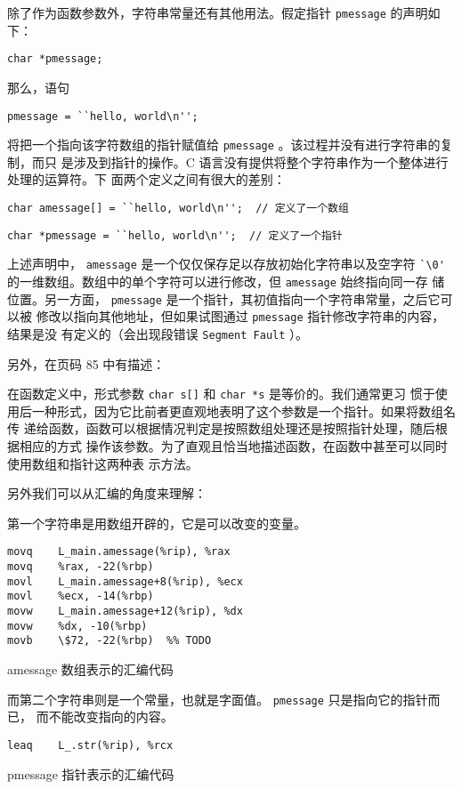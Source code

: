 除了作为函数参数外，字符串常量还有其他用法。假定指针 \verb|pmessage| 的声明如下：

\verb|char *pmessage;|

\noindent 那么，语句

\verb|pmessage = ``hello, world\n'';|

\noindent 将把一个指向该字符数组的指针赋值给 \verb|pmessage| 。该过程并没有进行字符串的复制，而只
是涉及到指针的操作。C 语言没有提供将整个字符串作为一个整体进行处理的运算符。下
面两个定义之间有很大的差别：

\verb|char amessage[] = ``hello, world\n'';  // 定义了一个数组|

\verb|char *pmessage = ``hello, world\n'';  // 定义了一个指针|

上述声明中， \verb|amessage| 是一个仅仅保存足以存放初始化字符串以及空字符
\verb|`\0'| 的一维数组。数组中的单个字符可以进行修改，但 \verb|amessage| 始终指向同一存
储位置。另一方面， \verb|pmessage| 是一个指针，其初值指向一个字符串常量，之后它可以被
修改以指向其他地址，但如果试图通过 \verb|pmessage| 指针修改字符串的内容，结果是没
有定义的（会出现段错误 \verb|Segment Fault| ）。

另外，在页码 85 中有描述：

在函数定义中，形式参数 \verb|char s[]| 和 \verb|char *s| 是等价的。我们通常更习
惯于使用后一种形式，因为它比前者更直观地表明了这个参数是一个指针。如果将数组名传
递给函数，函数可以根据情况判定是按照数组处理还是按照指针处理，随后根据相应的方式
操作该参数。为了直观且恰当地描述函数，在函数中甚至可以同时使用数组和指针这两种表
示方法。

另外我们可以从汇编的角度来理解：

第一个字符串是用数组开辟的，它是可以改变的变量。

\begin{sourcecode}[hbtp]
\begin{Verbatim}
movq    L_main.amessage(%rip), %rax
movq    %rax, -22(%rbp)
movl    L_main.amessage+8(%rip), %ecx
movl    %ecx, -14(%rbp)
movw    L_main.amessage+12(%rip), %dx
movw    %dx, -10(%rbp)
movb    \$72, -22(%rbp)  %% TODO
\end{Verbatim}
\caption{amessage 数组表示的汇编代码}
\end{sourcecode}

而第二个字符串则是一个常量，也就是字面值。 \verb|pmessage| 只是指向它的指针而已，
而不能改变指向的内容。

\begin{sourcecode}[hbtp]
\begin{Verbatim}
leaq    L_.str(%rip), %rcx
\end{Verbatim}
\caption{pmessage 指针表示的汇编代码}
\end{sourcecode}

